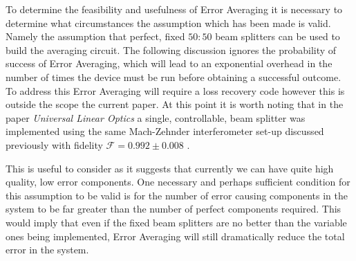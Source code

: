 \documentclass[aps,pra,twocolumn,superscriptaddress,numerical,floatfix]{revtex4-1}
\begin{document}
To determine the feasibility and usefulness of Error Averaging it is necessary to determine what circumstances the assumption which has been made is valid. Namely the assumption that perfect, fixed $50:50$ beam splitters can be used to build the averaging circuit. The following discussion ignores the probability of success of Error Averaging, which will lead to an exponential overhead in the number of times the device must be run before obtaining a successful outcome. To address this Error Averaging will require a loss recovery code \cite{OQC} however this is outside the scope the current paper. At this point it is worth noting that in the paper  \textit{Universal Linear Optics} a single, controllable, beam splitter was implemented using the same Mach-Zehnder interferometer set-up discussed previously with fidelity $\mathcal{F}=0.992\pm0.008$ \cite{ULO}. 

This is useful to consider as it suggests that currently we can have quite high quality, low error components. One necessary and perhaps sufficient condition for this assumption to be valid is for the number of error causing components in the system to be far greater than the number of perfect components required. This would imply that even if the fixed beam splitters are no better than the variable ones being implemented, Error Averaging will still dramatically reduce the total error in the system. 
\end{document}
